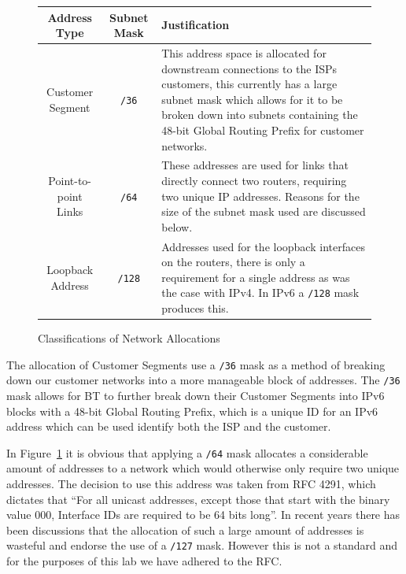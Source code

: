 \begin{figure}[!ht]     \caption{Classifications of Network Allocations}
\label{figure:network-alloc-3}     \centering
\begin{tabular}{|c|c|p{5.5cm}|}

        \hline \textbf{Address Type} & \textbf{Subnet Mask} &
		\textbf{Justification} \\

        \hline         Customer Segment & \texttt{/36} & This address space is
allocated for downstream connections to the ISPs customers, this currently has
a large subnet mask which allows for it to be broken down into subnets
containing the 48-bit Global Routing Prefix for customer networks.\\

        \hline         Point-to-point Links & \texttt{/64} & These addresses
are used for links that directly connect two routers, requiring two unique IP
addresses. Reasons for the size of the subnet mask used are discussed below.\\

        \hline         Loopback Address & \texttt{/128} & Addresses used for
the loopback interfaces on the routers, there is only a requirement for a
single address as was the case with IPv4. In IPv6 a \texttt{/128} mask produces
this.\\

		\hline     \end{tabular} \end{figure}

The allocation of Customer Segments use a \texttt{/36} mask as a method of
breaking down our customer networks into a more manageable block of addresses.
The \texttt{/36} mask allows for BT to further break down their Customer
Segments into IPv6 blocks with a 48-bit Global Routing Prefix, which is a
unique ID for an IPv6 address which can be used identify both the ISP and the
customer.

In Figure~\ref{figure:network-alloc-3} it is obvious that applying a
\texttt{/64} mask allocates a considerable amount of addresses to a network
which would otherwise only require two unique addresses. The decision to use
this address was taken from RFC 4291, which dictates that ``For all unicast
addresses, except those that start with the binary value 000, Interface IDs are
required to be 64 bits long''. In recent years there has been discussions that
the allocation of such a large amount of addresses is wasteful and endorse the
use of a \texttt{/127} mask. However this is not a standard and for the
purposes of this lab we have adhered to the RFC.
